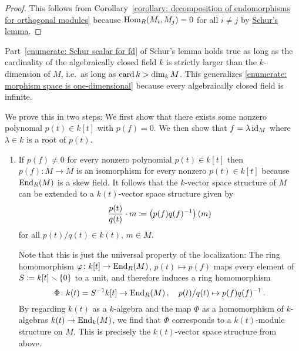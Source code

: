 \begin{proof}
  This follows from Corollary~\ref{corollary: decomposition of endomorphisms for orthogonal modules} because $\operatorname{Hom}_R(M_i, M_j) = 0$ for all $i \neq j$ by \hyperref[proposition: schurs lemma for modules]{Schur’s lemma}.
\end{proof}



\begin{remark}
  \label{remark: Schur for cardinality big enough}
  Part~\ref{enumerate: Schur scalar for fd} of Schur’s lemma holds true as long as the cardinality of the algebraically closed field $k$ is strictly larger than the $k$-dimension of $M$, i.e.\ as long as $\operatorname{card} k > \dim_k M$.
  This generalizes \ref{enumerate: morphism space is one-dimensional} because every algebraically closed field is infinite.

  We prove this in two steps:
  We first show that there exists some nonzero polynomal $p(t) \in k[t]$ with $p(f) = 0$.
  We then show that $f = \lambda \operatorname{id}_M$ where $\lambda \in k$ is a root of $p(t)$.
  \begin{enumerate}[label=\arabic*)]
    \item
      If $p(f) \neq 0$ for every nonzero polynomial $p(t) \in k[t]$ then $p(f) \colon M \to M$ is an isomorphism for every nonzero $p(t) \in k[t]$ because $\operatorname{End}_R(M)$ is a skew field.
      It follows that the $k$-vector space structure of $M$ can be extended to a $k(t)$-vector space structure given by
      \[
                  \frac{p(t)}{q(t)} \cdot m
        \coloneqq  \left( p(f) q(f)^{-1} \right)(m)
      \]
      for all $p(t)/q(t) \in k(t)$, $m \in M$.
      
      Note that this is just the universal property of the localization:
      The ring homomorphism $\varphi \colon k[t] \to \operatorname{End}_R(M)$, $p(t) \mapsto p(f)$ maps every element of $S \coloneqq k[t] \smallsetminus \{0\}$ to a unit, and therefore induces a ring homomorphism
      \[
                \Phi
        \colon  k(t)
        =       S^{-1} k[t]
        \to     \operatorname{End}_R(M) \,,
        \quad   p(t)/q(t)
        \mapsto p(f) q(f)^{-1} \,.
      \]
      By regarding $k(t)$ as a $k$-algebra and the map $\Phi$ as a homomorphism of $k$-algebras $k(t) \to \operatorname{End}_k(M)$, we find that $\Phi$ corresponds to a $k(t)$-module structure on $M$.
      This is precisely the $k(t)$-vector space structure from above.
      

\end{enumerate}
\end{remark}

